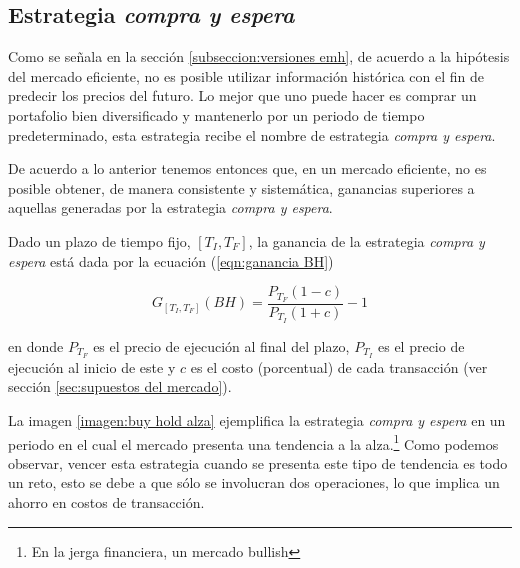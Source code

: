 \documentclass[12pt]{report}
\theoremstyle{break}
\theoremstyle{break}
\begin{document}
\subsection{Estrategia \textit{compra y espera}}
\label{seccion:buy and hold}
Como se señala en la sección \ref{subseccion:versiones emh}, de acuerdo a la hipótesis del mercado eficiente, no es posible utilizar información histórica con el fin de predecir los precios del futuro. Lo mejor que uno puede hacer es comprar un portafolio bien diversificado y mantenerlo por un periodo de tiempo predeterminado, esta estrategia recibe el nombre de estrategia \textit{compra y espera}.

De acuerdo a lo anterior tenemos entonces que, en un mercado eficiente, no es posible obtener, de manera consistente y sistemática, ganancias superiores a aquellas generadas por la estrategia \textit{compra y espera}.

Dado un plazo de tiempo fijo, $\left[T_{I}, T_{F}\right]$, la ganancia de la estrategia \textit{compra y espera} está dada por la ecuación (\ref{eqn:ganancia BH})

\begin{equation} \label{eqn:ganancia BH}
G_{\left[T_{I}, T_{F}\right]} (BH) = \dfrac{P_{T_F} (1 - c) } { P_{T_I} (1 + c) } - 1
\end{equation}

en donde $P_{T_F}$ es el precio de ejecución al final del plazo, $P_{T_I}$ es el precio de ejecución al inicio de este y $c$ es el costo (porcentual) de cada transacción (ver sección \ref{sec:supuestos del mercado}). 

La imagen \ref{imagen:buy hold alza} ejemplifica la estrategia \textit{compra y espera} en un periodo en el cual el mercado presenta una tendencia a la alza.\footnote{En la jerga financiera, un mercado bullish} Como podemos observar, vencer esta estrategia cuando se presenta este tipo de tendencia es todo un reto, esto se debe a que sólo se involucran dos operaciones, lo que implica un ahorro en costos de transacción.
\end{document}
